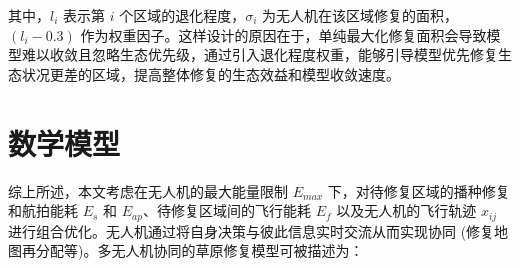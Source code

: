 \documentclass[AutoFakeBold]{LZUThesis}
\begin{document}
其中，$l_i$ 表示第 $i$ 个区域的退化程度，$\sigma_i$ 为无人机在该区域修复的面积，$(l_i - 0.3)$ 作为权重因子。这样设计的原因在于，单纯最大化修复面积会导致模型难以收敛且忽略生态优先级，通过引入退化程度权重，能够引导模型优先修复生态状况更差的区域，提高整体修复的生态效益和模型收敛速度。

\section{数学模型}

综上所述，本文考虑在无人机的最大能量限制 $E_{max}$ 下，对待修复区域的播种修复和航拍能耗 $E_s$ 和 $E_{ap}$、待修复区域间的飞行能耗 $E_f$ 以及无人机的飞行轨迹 $x_{ij}$ 进行组合优化。无人机通过将自身决策与彼此信息实时交流从而实现协同 (修复地图再分配等)。多无人机协同的草原修复模型可被描述为：
\end{document}
